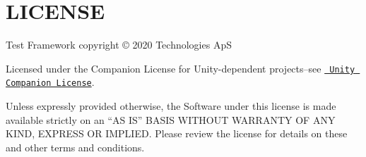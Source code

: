 \chapter{LICENSE}
\hypertarget{md__library_2_package_cache_2com_8unity_8test-framework_0d1_81_833_2_l_i_c_e_n_s_e}{}\label{md__library_2_package_cache_2com_8unity_8test-framework_0d1_81_833_2_l_i_c_e_n_s_e}
Test Framework copyright © 2020  Technologies ApS

Licensed under the  Companion License for Unity-\/dependent projects--see \href{http://www.unity3d.com/legal/licenses/Unity_Companion_License}{\texttt{ Unity Companion License}}.

Unless expressly provided otherwise, the Software under this license is made available strictly on an “\+AS IS” BASIS WITHOUT WARRANTY OF ANY KIND, EXPRESS OR IMPLIED. Please review the license for details on these and other terms and conditions. 